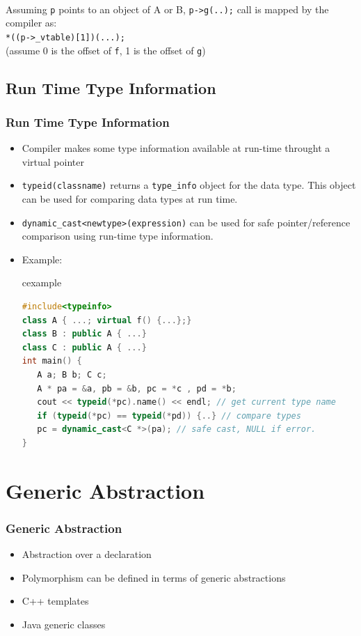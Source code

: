\begin{frame}
\ \\
Assuming \lstinline!p! points to an object of A or B, \lstinline!p->g(..);! call is mapped by the compiler as:\\
\lstinline!*((p->_vtable)[1])(...);! \\
(assume 0 is the offset of \lstinline!f!, 1 is the offset of \lstinline!g!)
\end{frame}

\subsection{Run Time Type Information}
\begin{frame}[fragile]
\frametitle{Run Time Type Information}
\begin{itemize}
\item Compiler makes some type information available at run-time
throught a virtual pointer
\item \lstinline{typeid(classname)} returns a \lstinline{type_info} object for the data type.
This object can be used for comparing data types at run time.
\item \lstinline{dynamic_cast<newtype>(expression)} can be used for safe pointer/reference comparison
using run-time type information.
\item Example:
\begin{beamercolorbox}{cexample}
\begin{lstlisting}[language={C++}]
#include<typeinfo>
class A { ...; virtual f() {...};}
class B : public A { ...}
class C : public A { ...}
int main() {
   A a; B b; C c;
   A * pa = &a, pb = &b, pc = *c , pd = *b;
   cout << typeid(*pc).name() << endl; // get current type name
   if (typeid(*pc) == typeid(*pd)) {..} // compare types
   pc = dynamic_cast<C *>(pa); // safe cast, NULL if error.
}
\end{lstlisting}
\end{beamercolorbox}
\end{itemize}
\end{frame}

\section{Generic Abstraction}
\begin{frame}
\frametitle{Generic Abstraction}
\begin{itemize}
\item Abstraction over a declaration
\item Polymorphism can be defined in terms of generic abstractions
\item C++ templates
\item Java generic classes
\end{itemize}
\end{frame}


